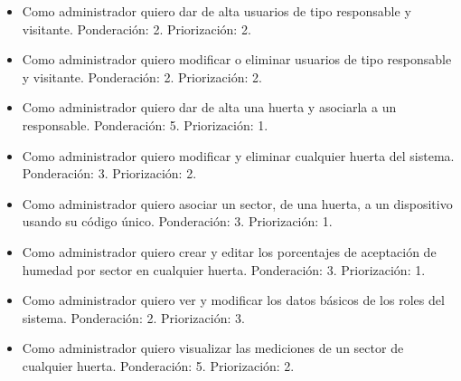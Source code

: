 \documentclass[
11pt, %
codirector, %
]{charter}
\begin{document}
\begin{itemize}
	\item Como administrador quiero dar de alta usuarios de tipo responsable y visitante.
	\newline Ponderación: 2.
	\newline Priorización: 2.
	\item Como administrador quiero modificar o eliminar usuarios de tipo responsable y visitante.
	\newline Ponderación: 2.
	\newline Priorización: 2.
	\item Como administrador quiero dar de alta una huerta y asociarla a un responsable.
	\newline Ponderación: 5.
	\newline Priorización: 1.
	\item Como administrador quiero modificar y eliminar cualquier huerta del sistema.
	\newline Ponderación: 3.
	\newline Priorización: 2.	
	\item Como administrador quiero asociar un sector, de una huerta, a un dispositivo usando su código único.
	\newline Ponderación: 3.
	\newline Priorización: 1.
	\item Como administrador quiero crear y editar los porcentajes de aceptación de humedad por sector en cualquier huerta.
	\newline Ponderación: 3.
	\newline Priorización: 1.
	\item Como administrador quiero ver y modificar los datos básicos de los roles del sistema.
	\newline Ponderación: 2.
	\newline Priorización: 3.
	\item Como administrador quiero visualizar las mediciones de un sector de cualquier huerta.
	\newline Ponderación: 5.
	\newline Priorización: 2.
	

\end{itemize}
\end{document}
